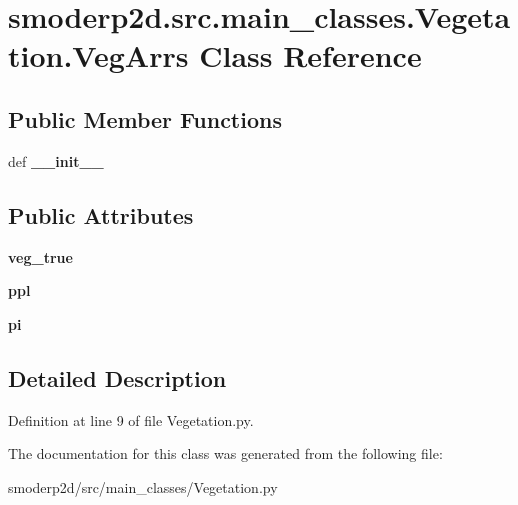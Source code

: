\hypertarget{classsmoderp2d_1_1src_1_1main__classes_1_1Vegetation_1_1VegArrs}{\section{smoderp2d.\-src.\-main\-\_\-classes.\-Vegetation.\-Veg\-Arrs Class Reference}
\label{classsmoderp2d_1_1src_1_1main__classes_1_1Vegetation_1_1VegArrs}
}
\subsection*{Public Member Functions}
\begin{DoxyCompactItemize}
\item 
\hypertarget{classsmoderp2d_1_1src_1_1main__classes_1_1Vegetation_1_1VegArrs_aa10c88b822b18c2d6b19954c8d2cc8dd}{def {\bfseries \-\_\-\-\_\-init\-\_\-\-\_\-}}\label{classsmoderp2d_1_1src_1_1main__classes_1_1Vegetation_1_1VegArrs_aa10c88b822b18c2d6b19954c8d2cc8dd}

\end{DoxyCompactItemize}
\subsection*{Public Attributes}
\begin{DoxyCompactItemize}
\item 
\hypertarget{classsmoderp2d_1_1src_1_1main__classes_1_1Vegetation_1_1VegArrs_a16b63c13be70c6dad44bf2e0773c9ad2}{{\bfseries veg\-\_\-true}}\label{classsmoderp2d_1_1src_1_1main__classes_1_1Vegetation_1_1VegArrs_a16b63c13be70c6dad44bf2e0773c9ad2}

\item 
\hypertarget{classsmoderp2d_1_1src_1_1main__classes_1_1Vegetation_1_1VegArrs_ad7a7ce1bf3b553b5830e26e024bfc80f}{{\bfseries ppl}}\label{classsmoderp2d_1_1src_1_1main__classes_1_1Vegetation_1_1VegArrs_ad7a7ce1bf3b553b5830e26e024bfc80f}

\item 
\hypertarget{classsmoderp2d_1_1src_1_1main__classes_1_1Vegetation_1_1VegArrs_a76bc6f578cf57962308c935b08fdcade}{{\bfseries pi}}\label{classsmoderp2d_1_1src_1_1main__classes_1_1Vegetation_1_1VegArrs_a76bc6f578cf57962308c935b08fdcade}

\end{DoxyCompactItemize}


\subsection{Detailed Description}


Definition at line 9 of file Vegetation.\-py.



The documentation for this class was generated from the following file\-:\begin{DoxyCompactItemize}
\item 
smoderp2d/src/main\-\_\-classes/Vegetation.\-py\end{DoxyCompactItemize}
